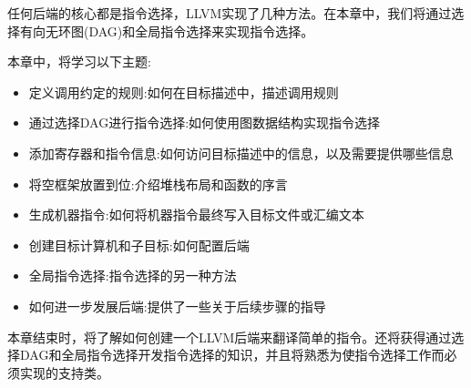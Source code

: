 任何后端的核心都是指令选择，LLVM实现了几种方法。在本章中，我们将通过选择有向无环图(DAG)和全局指令选择来实现指令选择。

本章中，将学习以下主题:

\begin{itemize}
\item
定义调用约定的规则:如何在目标描述中，描述调用规则

\item
通过选择DAG进行指令选择:如何使用图数据结构实现指令选择

\item
添加寄存器和指令信息:如何访问目标描述中的信息，以及需要提供哪些信息

\item
将空框架放置到位:介绍堆栈布局和函数的序言

\item
生成机器指令:如何将机器指令最终写入目标文件或汇编文本

\item
创建目标计算机和子目标:如何配置后端

\item
全局指令选择:指令选择的另一种方法

\item
如何进一步发展后端:提供了一些关于后续步骤的指导
\end{itemize}

本章结束时，将了解如何创建一个LLVM后端来翻译简单的指令。还将获得通过选择DAG和全局指令选择开发指令选择的知识，并且将熟悉为使指令选择工作而必须实现的支持类。









































